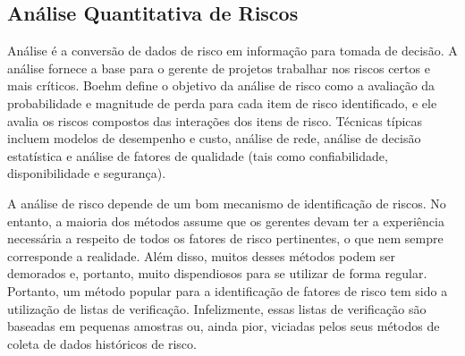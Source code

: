 \subsection{Análise Quantitativa de Riscos}

Análise é a conversão de dados de risco em informação para tomada de decisão. A análise fornece a base para o gerente de projetos trabalhar nos riscos certos e mais críticos. Boehm \cite{BOEHM1991} define o objetivo da análise de risco como a avaliação da probabilidade e magnitude de perda para cada item de risco identificado, e ele avalia os riscos compostos das interações dos itens de risco. Técnicas típicas incluem modelos de desempenho e custo, análise de rede, análise de decisão estatística e análise de fatores de qualidade (tais como confiabilidade, disponibilidade e segurança).

A análise de risco depende de um bom mecanismo de identificação de riscos. No entanto, a maioria dos métodos assume que os gerentes devam ter a experiência necessária a respeito de todos os fatores de risco pertinentes, o que nem sempre corresponde a realidade. Além disso, muitos desses métodos podem ser demorados e, portanto, muito dispendiosos para se utilizar de forma regular. Portanto, um método popular para a identificação de fatores de risco tem sido a utilização de listas de verificação. Infelizmente, essas listas de verificação são baseadas em pequenas amostras ou, ainda pior, viciadas pelos seus métodos de coleta de dados históricos de risco.

